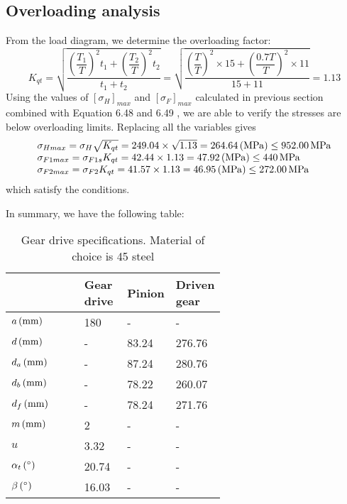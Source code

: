\subsection{Overloading analysis}
From the load diagram, we determine the overloading factor:
\[
K_{qt}=\sqrt{\dfrac{\left(\dfrac{T_1}{T}\right)^2t_1 + \left(\dfrac{T_2}{T}\right)^2t_2}{t_1+t_2}}= \sqrt{\dfrac{\left(\dfrac{T}{T}\right)^2\times15 + \left(\dfrac{0.7T}{T}\right)^2\times11}{15+11}} = 1.13
\]
Using the values of $ [\sigma_H]_{max} $ and $ [\sigma_F]_{max} $ calculated in previous section combined with Equation 6.48 and 6.49 \cite{tk1}, we are able to verify the stresses are below overloading limits. Replacing all the variables gives
\[
\begin{array}{l}
\sigma_{Hmax}=\sigma_H\sqrt{K_{qt}} = 249.04\times\sqrt{1.13} = 264.64 \, (\mathrm{MPa}) \leq 952.00 \, \mathrm{MPa}\\
\sigma_{F1max}=\sigma_{F1s}K_{qt} =42.44\times 1.13 = 47.92 \, (\mathrm{MPa}) \leq 440 \, \mathrm{MPa}\\
\sigma_{F2max}=\sigma_{F2}K_{qt} =41.57\times 1.13 = 46.95 \, (\mathrm{MPa}) \leq 272.00 \, \mathrm{MPa}\\
\end{array}
\]
which satisfy the conditions.

In summary, we have the following table:

\begin{table}[ht]
	\centering
	\begin{tabular}{lp{0.2\linewidth}p{0.2\linewidth}p{0.2\linewidth}}\toprule
		& Gear drive & Pinion & Driven gear \\ \midrule
		$ a\, (\mathrm{mm})    $	&	180	&	-		&	-		\\
		$ d\, (\mathrm{mm})    $	&	-		&	83.24	&	276.76	\\
		$ d_a\, (\mathrm{mm})  $	&	-		&	87.24	&	280.76	\\
		$ d_b\, (\mathrm{mm})  $	&	-		&	78.22	&	260.07	\\
		$ d_f\, (\mathrm{mm})  $	&	-		&	78.24	&	271.76	\\
		$ m\, (\mathrm{mm})    $	&	2	&	-		&	-		\\
		$ u			     $	&	3.32	&	-		&	-		\\
		$ \alpha_t\, (\mathrm{^\circ})    $	&	20.74	&	-		&	-		\\
		$ \beta\, (\mathrm{^\circ})    $	&	16.03	&	-		&	-		\\
		\bottomrule
	\end{tabular}
	\caption{Gear drive specifications. Material of choice is 45 steel}
\end{table}